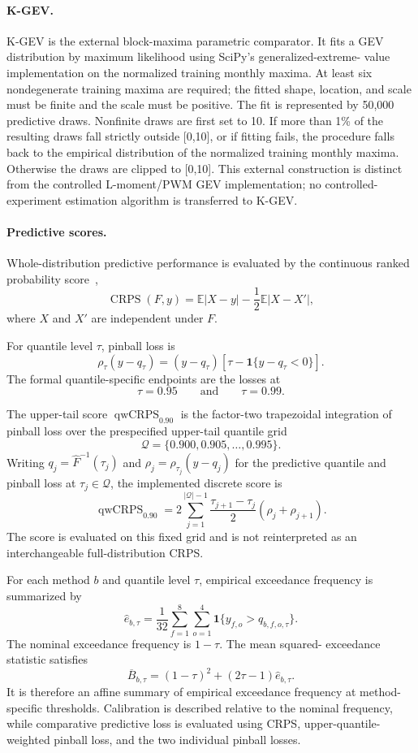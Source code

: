 \documentclass[]{interact}
\begin{document}
\paragraph*{K-GEV.}

K-GEV is the external block-maxima parametric comparator. It fits a GEV
distribution by maximum likelihood using SciPy's generalized-extreme-
value implementation on the normalized training monthly maxima. At
least six nondegenerate training maxima are required; the fitted shape,
location, and scale must be finite and the scale must be positive. The
fit is represented by 50,000 predictive draws. Nonfinite draws are first set to 10. If more than 1\% of the
resulting draws fall strictly outside [0,10], or if fitting fails,
the procedure falls back to the empirical distribution of the
normalized training monthly maxima. Otherwise the draws are clipped
to [0,10]. This external construction is distinct from the controlled
L-moment/PWM GEV implementation; no controlled-experiment estimation
algorithm is transferred to K-GEV.

\paragraph*{Predictive scores.}

Whole-distribution predictive performance is evaluated by the
continuous ranked probability score~\cite{GneitingRaftery2007},
\[
\operatorname{CRPS}(F,y)
=
\mathbb E|X-y|
-
\frac12\mathbb E|X-X'|,
\]
where \(X\) and \(X'\) are independent under \(F\).

For quantile level \(\tau\), pinball loss is
\[
\rho_\tau(y-q_\tau)
=
(y-q_\tau)
\left[
\tau-\mathbf 1\{y-q_\tau<0\}
\right].
\]
The formal quantile-specific endpoints are the losses at
\[
\tau=0.95
\qquad\text{and}\qquad
\tau=0.99.
\]

The upper-tail score
\(\operatorname{qwCRPS}_{0.90}\) is the factor-two trapezoidal
integration of pinball loss over the prespecified upper-tail quantile
grid
\[
\mathcal Q
=
\{0.900,0.905,\ldots,0.995\}.
\]
Writing $q_j=\widehat F^{-1}(\tau_j)$ and
$\rho_j=\rho_{\tau_j}(y-q_j)$ for the predictive quantile and
pinball loss at $\tau_j\in\mathcal Q$, the implemented discrete score
is
\[
\operatorname{qwCRPS}_{0.90}
=
2\sum_{j=1}^{|\mathcal Q|-1}
\frac{\tau_{j+1}-\tau_j}{2}
\left(\rho_j+\rho_{j+1}\right).
\]
The score is evaluated on this fixed grid and is not reinterpreted as an
interchangeable full-distribution CRPS.

For each method $b$ and quantile level $\tau$, empirical exceedance
frequency is summarized by
\[
\widehat e_{b,\tau}
=\frac{1}{32}\sum_{f=1}^{8}\sum_{o=1}^{4}
\mathbf 1\{y_{f,o}>q_{b,f,o,\tau}\}.
\]
The nominal exceedance frequency is $1-\tau$. The mean squared-
exceedance statistic satisfies
\[
\overline B_{b,\tau}
=(1-\tau)^2+(2\tau-1)\widehat e_{b,\tau}.
\]
It is therefore an affine summary of empirical exceedance frequency at
method-specific thresholds. Calibration is described relative to the
nominal frequency, while comparative predictive loss is evaluated
using CRPS, upper-quantile-weighted pinball loss, and the two
individual pinball losses.
\end{document}

